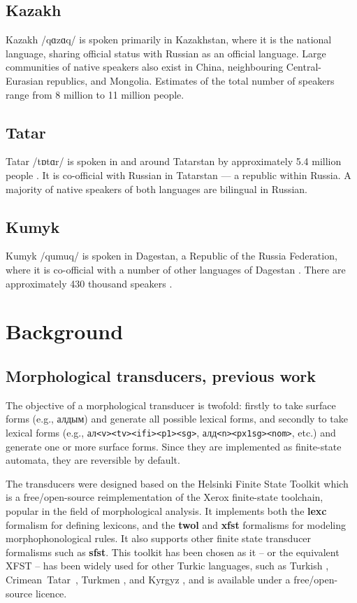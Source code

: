 \documentclass[a4paper,11pt,twocolumn]{article}
\begin{document}
\subsection{Kazakh}
Kazakh /q{\symbl ɑ}z{\symbl ɑ}q/ is spoken primarily in Kazakhstan, where it is the national language, sharing official status with Russian as an official language.  Large communities of native speakers also exist in China, neighbouring Central-Eurasian republics, and Mongolia.  Estimates of the total number of speakers range from 8 million \citep{ethnologue} to 11 million \citep{nationalencyklopedin} people.

\subsection{Tatar}
Tatar /t{\symbl ɒ}t{\symbl ɑ}r/ is spoken in and around Tatarstan by approximately 5.4 million people \citep{ethnologue}.  It is co-official with Russian in Tatarstan --- a republic within Russia.  A majority of native speakers of both languages are bilingual in Russian. %

\subsection{Kumyk}
Kumyk /qumuq/ is spoken in Dagestan, a Republic of the Russia Federation, where it is co-official with a number of other languages of Dagestan \citep{ethnologue}.  There are approximately 430 thousand speakers \citep{ethnologue}.

\section{Background}
\subsection{Morphological transducers, previous work}
The objective of a morphological transducer is twofold: firstly to take surface forms (e.g., алдым) and generate all possible lexical forms, and secondly to take lexical forms (e.g.,  ал{\tt {\small <v><tv><ifi><p1><sg>}}, алд{\tt {\small <n><px1sg><nom>}}, etc.) and generate one or more surface forms.  Since they are implemented as finite-state automata, they are reversible by default.

The transducers were designed based on the Helsinki Finite State Toolkit \citep{hfst/2011} which is a free/open-source reimplementation of the Xerox finite-state toolchain, popular in the field of morphological analysis.  It implements both the \textbf{lexc} formalism for defining lexicons, and the \textbf{twol} and \textbf{xfst} formalisms for modeling morphophonological rules.  It also supports other finite state transducer formalisms such as \textbf{sfst}.  This toolkit has been chosen as it -- or the equivalent XFST -- has been widely used for other Turkic languages, such as Turkish \citep{coltekin2010}, Crimean~Tatar~\citep{altintas2001}, Turkmen \citep{tantug2006}, and Kyrgyz \citep{washington2012}, and is available under a free/open-source licence.
\end{document}
